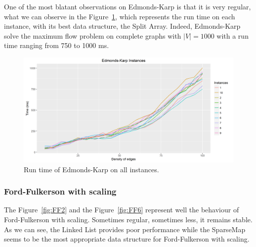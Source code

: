 One of the most blatant observations on Edmonds-Karp is that it is very regular, what we can observe in the Figure~\ref{fig:EKmean}, which represents the run time on each instance, with its best data structure, the Split Array. Indeed, Edmonds-Karp solve the maximum flow problem on complete graphs with $|V|=1000$ with a run time ranging from 750 to 1000 ms.

\begin{figure}[H]
\includegraphics[scale=0.63]{images/EKmean.png}
\caption{Run time of Edmonds-Karp on all instances.}
\label{fig:EKmean}
\end{figure}

\subsubsection{Ford-Fulkerson with scaling}
The Figure~\ref{fig:FF2} and the Figure~\ref{fig:FF6} represent well the behaviour of Ford-Fulkerson with scaling. Sometimes regular, sometimes less, it remains stable. As we can see, the Linked List provides poor performance while the SparseMap seems to be the most appropriate data structure for Ford-Fulkerson with scaling.

